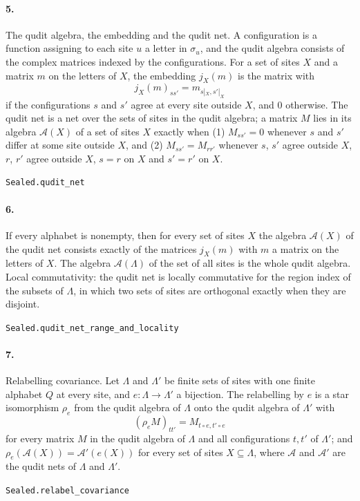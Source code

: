 \documentclass[11pt]{article}
\begin{document}
\paragraph{5.} The qudit algebra, the embedding and the qudit net. A configuration is a function assigning to each site $u$ a letter in $\sigma_u$, and the qudit algebra consists of the complex matrices indexed by the configurations. For a set of sites $X$ and a matrix $m$ on the letters of $X$, the embedding $j_X(m)$ is the matrix with \[j_X(m)_{s s'} = m_{s|_X, s'|_X}\] if the configurations $s$ and $s'$ agree at every site outside $X$, and $0$ otherwise. The qudit net is a net over the sets of sites in the qudit algebra; a matrix $M$ lies in its algebra $\mathcal A(X)$ of a set of sites $X$ exactly when (1) $M_{s s'} = 0$ whenever $s$ and $s'$ differ at some site outside $X$, and (2) $M_{s s'} = M_{r r'}$ whenever $s$, $s'$ agree outside $X$, $r$, $r'$ agree outside $X$, $s = r$ on $X$ and $s' = r'$ on $X$.\par{\footnotesize\texttt{Sealed.qudit\_net}}

\paragraph{6.} If every alphabet is nonempty, then for every set of sites $X$ the algebra $\mathcal A(X)$ of the qudit net consists exactly of the matrices $j_X(m)$ with $m$ a matrix on the letters of $X$. The algebra $\mathcal A(\Lambda)$ of the set of all sites is the whole qudit algebra. Local commutativity: the qudit net is locally commutative for the region index of the subsets of $\Lambda$, in which two sets of sites are orthogonal exactly when they are disjoint.\par{\footnotesize\texttt{Sealed.qudit\_net\_range\_and\_locality}}

\paragraph{7.} Relabelling covariance. Let $\Lambda$ and $\Lambda'$ be finite sets of sites with one finite alphabet $Q$ at every site, and $e : \Lambda \to \Lambda'$ a bijection. The relabelling by $e$ is a star isomorphism $\rho_e$ from the qudit algebra of $\Lambda$ onto the qudit algebra of $\Lambda'$ with \[(\rho_e M)_{t t'} = M_{t \circ e, t' \circ e}\] for every matrix $M$ in the qudit algebra of $\Lambda$ and all configurations $t, t'$ of $\Lambda'$; and $\rho_e(\mathcal A(X)) = \mathcal A'(e(X))$ for every set of sites $X \subseteq \Lambda$, where $\mathcal A$ and $\mathcal A'$ are the qudit nets of $\Lambda$ and $\Lambda'$.\par{\footnotesize\texttt{Sealed.relabel\_covariance}}
\end{document}
